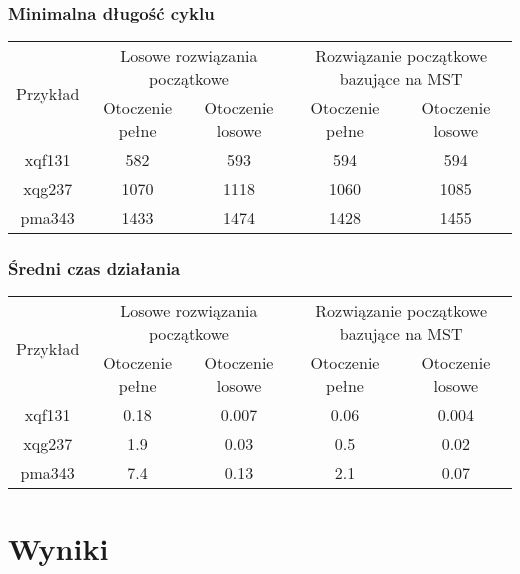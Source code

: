 \documentclass{article}
\begin{document}
\subsubsection*{Minimalna długość cyklu}
\begin{table}[h!]
    \centering
    \begin{tabular}{|c|c|c|c|c|}
        \hline 
        \multirow{2}{*}{Przykład} & \multicolumn{2}{|c|}{Losowe rozwiązania początkowe} & \multicolumn{2}{|c|}{Rozwiązanie początkowe bazujące na MST} \\
        \cline{2-5}
        \cline{2-5} & Otoczenie pełne & Otoczenie losowe & Otoczenie pełne & Otoczenie losowe \\
        \hline
        xqf131 & 582 & 593 & 594 & 594 \\
        \hline
        xqg237 & 1070 & 1118 & 1060 & 1085 \\
        \hline
        pma343 & 1433 & 1474 & 1428 & 1455 \\
        \hline
    \end{tabular}
\end{table}

\subsubsection*{Średni czas działania}
\begin{table}[h!]
    \centering
    \begin{tabular}{|c|c|c|c|c|}
        \hline 
        \multirow{2}{*}{Przykład} & \multicolumn{2}{|c|}{Losowe rozwiązania początkowe} & \multicolumn{2}{|c|}{Rozwiązanie początkowe bazujące na MST} \\
        \cline{2-5}
        \cline{2-5} & Otoczenie pełne & Otoczenie losowe & Otoczenie pełne & Otoczenie losowe \\
        \hline
        xqf131 & 0.18 & 0.007 & 0.06 & 0.004 \\
        \hline
        xqg237 & 1.9 & 0.03 & 0.5 & 0.02 \\
        \hline
        pma343 & 7.4 & 0.13 & 2.1 & 0.07 \\
        \hline
    \end{tabular}
\end{table}

\section*{Wyniki}
\end{document}
